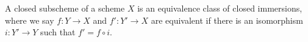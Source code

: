 A closed subscheme of a scheme $X$ is an equivalence class of closed immersions, where we say $f: Y \rightarrow X$ and $f': Y' \rightarrow X$ are equivalent if there is an isomorphism $i: Y' \rightarrow Y$ such that $f' = f \circ i$.

